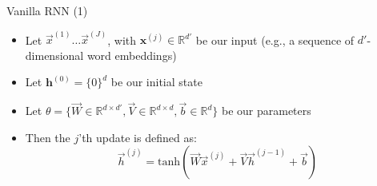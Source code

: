 \begin{vbframe}{Vanilla RNN (1)}

\vfill

\begin{itemize}
	\item Let $\vec x^{(1)} \ldots \vec x^{(J)}$, with $\mathbf{x}^{(j)} \in \mathbb{R}^{d'}$ be our input (e.g., a sequence of $d'$-dimensional word embeddings)
	\item Let $\mathbf{h}^{(0)}  = \{0\}^{d}$ be our initial state
	\item Let $\theta = \{\vec W \in \mathbb{R}^{d \times d'}, \vec V \in \mathbb{R}^{d \times d}, \vec b \in \mathbb{R}^{d}\}$ be our parameters
	\item Then the $j$'th update is defined as:
	$$\vec h^{(j)} = \mathrm{tanh}(\vec W \vec x^{(j)}  + \vec V \vec h^{({j-1})} + \vec b)$$
\end{itemize}

\vfill

\end{vbframe}


